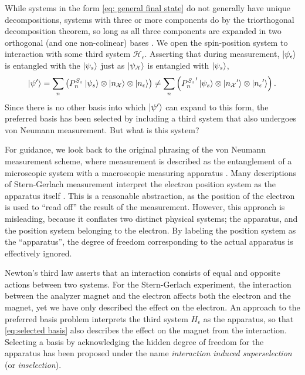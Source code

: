While systems in the form \autoref{eq: general final state} do not generally have unique decompositions, systems with three or more components do by the triorthogonal decomposition theorem, so long as all three components are expanded in two orthogonal (and one non-colinear) bases \cite{Elby}. We open the spin-position system to interaction with some third system $\mathcal{H}_\epsilon$. Asserting that during measurement, $\ket{\psi_\epsilon}$ is entangled with the $\ket{\psi_s}$ just as $\ket{\psi_\mathcal{X}}$ is entangled with $\ket{\psi_s}$,
\begin{align} \label{eq:selected basis}
  \ket{\psi'} = \sum_{n}\left(P^{S_z}_n\ket{\psi_s} \otimes \ket{n_\mathcal{X}} \otimes \ket{n_\epsilon} \right) \neq \sum_{n}\left({P^{S_z}_n}'\ket{\psi_s} \otimes \ket{{n_\mathcal{X}}'} \otimes \ket{{n_\epsilon}'} \right).
\end{align}
Since there is no other basis into which $\ket{\psi'}$ can expand to this form, the preferred basis has been selected by including a third system that also undergoes von Neumann measurement. But what is this system?

For guidance, we look back to the original phrasing of the von Neumann measurement scheme, where measurement is described as the entanglement of a microscopic system with a macroscopic measuring apparatus \cite{Neumann}. Many descriptions of Stern-Gerlach measurement interpret the electron position system as the apparatus itself \cite{Venugopalan}. This is a reasonable abstraction, as the position of the electron is used to ``read off'' the result of the measurement. However, this approach is misleading, because it conflates two distinct physical systems; the apparatus, and the position system belonging to the electron. By labeling the position system as the ``apparatus'', the degree of freedom corresponding to the actual apparatus is effectively ignored.

Newton's third law asserts that an interaction consists of equal and opposite actions between two systems. For the Stern-Gerlach experiment, the interaction between the analyzer magnet and the electron affects both the electron and the magnet, yet we have only described the effect on the electron. An approach to the preferred basis problem interprets the third system $H_\epsilon$ as the apparatus, so that \autoref{eq:selected basis} also describes the effect on the magnet from the interaction. Selecting a basis by acknowledging the hidden degree of freedom for the apparatus has been proposed under the name \textit{interaction induced superselection} (or \textit{inselection})\cite{Wang}.


